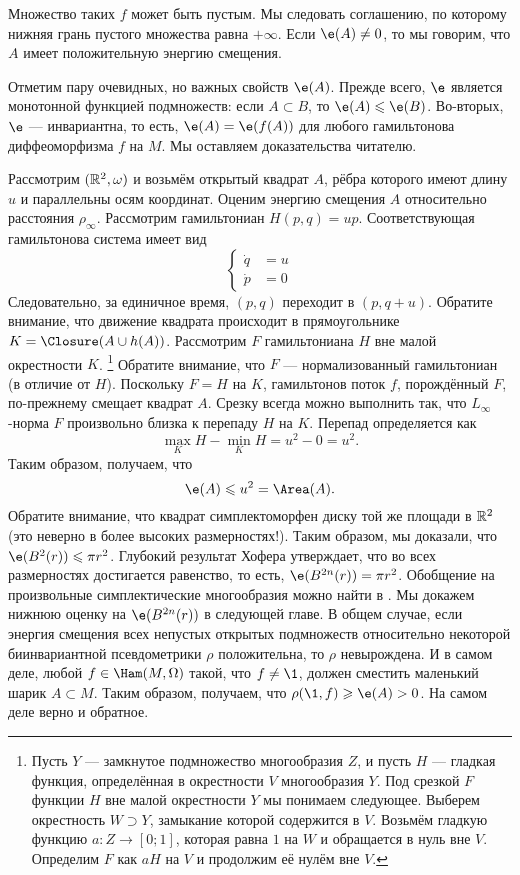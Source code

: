 Множество таких $f$ может быть пустым.
Мы  следовать соглашению, по которому нижняя грань пустого множества равна $+\infty$.
Если $\e (A) \ne 0$, то мы говорим, что $A$ имеет положительную энергию смещения.

Отметим пару очевидных, но важных свойств $\e(A)$.
Прежде всего, $\e$ является монотонной функцией подмножеств: если $A \subset B$, то $\e(A) \le \e(B)$.
Во-вторых, $\e$ --- инвариантна, то есть, $\e (A) = \e (f (A))$ для любого гамильтонова диффеоморфизма $f$ на $M$.
Мы оставляем доказательства читателю.

Рассмотрим $(\mathbb{R}^2, \omega)$ и возьмём открытый квадрат $A$, рёбра которого имеют длину $u$ и параллельны осям координат.
Оценим энергию смещения $A$ относительно расстояния $\rho_\infty$.
Рассмотрим гамильтониан $H (p, q) = up$.
Соответствующая гамильтонова система имеет вид 
\[
\begin{cases}
\dot q &= u
\\
\dot p &= 0
\end{cases}
\]
Следовательно, за единичное время, $(p, q)$ переходит в $(p, q + u)$.
Обратите внимание, что движение квадрата происходит в прямоугольнике $K = \Closure (A \cup h (A))$.
Рассмотрим  $F$ гамильтониана $H$ вне малой окрестности $K$.%
\footnote{Пусть $Y$ --- замкнутое подмножество многообразия $Z$, и пусть $H$ --- гладкая функция, определённая в окрестности $V$ многообразия $Y$.
Под срезкой $F$ функции $H$ вне малой окрестности $Y$ мы понимаем следующее.
Выберем окрестность $W\supset Y$, замыкание которой содержится в $V$.
Возьмём гладкую функцию $a\colon Z \to [0; 1]$, которая равна $1$ на $W$ и обращается в нуль вне $V$.
Определим $F$ как $aH$ на $V$ и продолжим её нулём вне $V$.}
Обратите внимание, что $F$ --- нормализованный гамильтониан (в отличие от $H$).
Поскольку $F = H$ на $K$, гамильтонов поток $f$, порождённый $F$, по-прежнему смещает квадрат $A$.
Срезку всегда можно выполнить так, что $L_\infty$-норма $F$ произвольно близка к перепаду $H$ на $K$.
Перепад определяется как 
\[\max_K H - \min_K H = u^2 - 0 = u^2.\]
Таким образом, получаем, что 
\[\e (A) \le u^2 = \Area (A).\]
Обратите внимание, что квадрат симплектоморфен диску той же площади в $\mathbb{R}^2$ (это неверно в более высоких размерностях!).
Таким образом, мы доказали, что $\e (B^2 (r)) \le \pi r^2$.
Глубокий результат Хофера \cite{H1} утверждает, что во всех размерностях достигается равенство, то есть, $\e (B^{2n} (r)) = \pi r^2$.
Обобщение на произвольные симплектические многообразия можно найти в \cite{LM1}.
Мы докажем нижнюю оценку на $\e(B^{2n} (r))$ в следующей главе.
В общем случае, если энергия смещения всех непустых открытых подмножеств относительно некоторой биинвариантной псевдометрики $\rho$ положительна, то $\rho$ невырождена.
И в самом деле, любой $f \in \Ham (M, \Omega)$ такой, что $f \ne \1$, должен сместить маленький шарик $A \subset M$.
Таким образом, получаем, что $\rho (\1, f) \ge \e (A)> 0$.
На самом деле верно и обратное.

